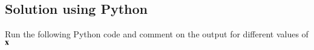 \subsection{Solution using Python}
\begin{problem}
Run the following Python code and comment on the output for different values of $\mathbf{x}$

%
%
%
%
%
%
%
%	

\end{problem}
%
%
%
%
%
%
%
%
%
%
%
%
%
%
%
%
%
%
%
